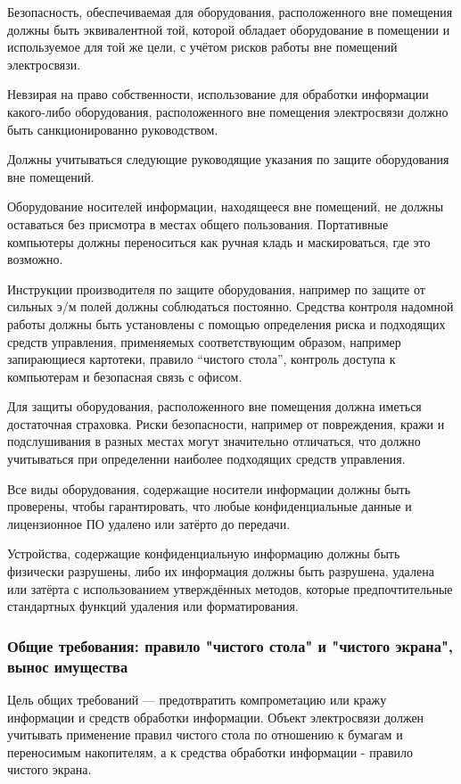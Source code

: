 \documentclass[12pt, russian, oneside, article]{ncc}
\begin{document}
Безопасность, обеспечиваемая для оборудования, расположенного вне помещения должны быть эквивалентной той, которой обладает оборудование в помещении и используемое для той же цели, с учётом рисков работы вне помещений электросвязи.

Невзирая на право собственности, использование для обработки информации какого-либо оборудования, расположенного вне помещения электросвязи должно быть санкционированно руководством.

Должны учитываться следующие руководящие указания по защите оборудования вне помещений.

Оборудование носителей информации, находящееся вне помещений, не должны оставаться без присмотра в местах общего пользования. Портативные компьютеры должны переноситься как ручная кладь и маскироваться, где это возможно.

Инструкции производителя по защите оборудования, например по защите от сильных э/м полей должны соблюдаться постоянно. Средства контроля надомной работы должны быть установлены с помощью определения риска и подходящих средств управления, применяемых соответствующим образом, например запирающиеся картотеки, правило ``чистого стола'', контроль доступа к компьютерам и безопасная связь с офисом.

Для защиты оборудования, расположенного вне помещения должна иметься достаточная страховка. Риски безопасности, например от повреждения, кражи и подслушивания в разных местах могут значительно отличаться, что должно учитываться при определенни наиболее подходящих средств управления.

Все виды оборудования, содержащие носители информации должны быть проверены, чтобы гарантировать, что любые конфиденциальные данные и лицензионное ПО удалено или затёрто до передачи.

Устройства, содержащие конфиденциальную информацию должны быть физически разрушены, либо их информация должны быть разрушена, удалена или затёрта с использованием утверждённых методов, которые предпочтительные стандартных функций удаления или форматирования.
\subsubsection{Общие требования: правило "чистого стола" и "чистого экрана", вынос имущества}
\label{sec-5_5_7}


Цель общих требований --- предотвратить компрометацию или кражу информации и средств обработки информации. Объект электросвязи должен учитывать применение правил чистого стола по отношению к бумагам и переносимым накопителям, а к средства обработки информации - правило чистого экрана.
\end{document}
